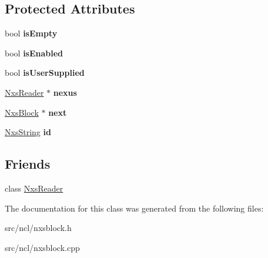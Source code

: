 \subsection*{Protected Attributes}
\begin{DoxyCompactItemize}
\item 
\hypertarget{classNxsBlock_a3838d36624b7c4dbe47abfc558804f24}{
bool {\bfseries isEmpty}}
\label{classNxsBlock_a3838d36624b7c4dbe47abfc558804f24}

\item 
\hypertarget{classNxsBlock_a05a921edcd6bafc355b0c80352ada90d}{
bool {\bfseries isEnabled}}
\label{classNxsBlock_a05a921edcd6bafc355b0c80352ada90d}

\item 
\hypertarget{classNxsBlock_a6d7a0fdf8299bdaeca506f9c679fe804}{
bool {\bfseries isUserSupplied}}
\label{classNxsBlock_a6d7a0fdf8299bdaeca506f9c679fe804}

\item 
\hypertarget{classNxsBlock_a19738e5181f077f44a194d1841abc897}{
\hyperlink{classNxsReader}{NxsReader} $\ast$ {\bfseries nexus}}
\label{classNxsBlock_a19738e5181f077f44a194d1841abc897}

\item 
\hypertarget{classNxsBlock_a7af6b491ff4bbc4430489843268a5520}{
\hyperlink{classNxsBlock}{NxsBlock} $\ast$ {\bfseries next}}
\label{classNxsBlock_a7af6b491ff4bbc4430489843268a5520}

\item 
\hypertarget{classNxsBlock_a5adb993ee6e0e71448e5c51424ef30cb}{
\hyperlink{classNxsString}{NxsString} {\bfseries id}}
\label{classNxsBlock_a5adb993ee6e0e71448e5c51424ef30cb}

\end{DoxyCompactItemize}
\subsection*{Friends}
\begin{DoxyCompactItemize}
\item 
\hypertarget{classNxsBlock_a52410e92e5139842228caeaf0ac8dcc1}{
class \hyperlink{classNxsBlock_a52410e92e5139842228caeaf0ac8dcc1}{NxsReader}}
\label{classNxsBlock_a52410e92e5139842228caeaf0ac8dcc1}

\end{DoxyCompactItemize}


The documentation for this class was generated from the following files:\begin{DoxyCompactItemize}
\item 
src/ncl/nxsblock.h\item 
src/ncl/nxsblock.cpp\end{DoxyCompactItemize}
